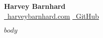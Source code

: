 \documentclass[$if(fontsize)$$fontsize$,$endif$$if(lang)$$babel-lang$,$endif$$if(papersize)$$papersize$,$endif$$for(classoption)$$classoption$$sep$,$endfor$]{article}
\begin{document}
\begin{center} 
{\huge \bfseries Harvey Barnhard\\}
{\href{https://harveybarnhard.com}{\faGlobe\ harveybarnhard.com} }
{\href{https://github.com/harveybarnhard}{\faGithub\ GitHub}\\ }
\end{center}

$body$
\end{document}
